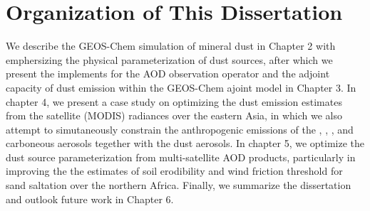 \section{Organization of This Dissertation}

 We describe the GEOS-Chem simulation of mineral dust in Chapter 2 with emphersizing the 
 physical parameterization of dust sources, after which we present the implements for the 
 AOD observation operator and the adjoint capacity of dust emission within the GEOS-Chem
 ajoint model in Chapter 3. In chapter 4, we present a case study on optimizing the dust 
 emission estimates from the satellite (MODIS) radiances over the eastern Asia, 
 in which we also attempt to 
 simutaneously constrain the anthropogenic emissions of the , , , 
 and carboneous aerosols tegether with the dust aerosols. In chapter 5, we optimize the 
 dust source parameterization from multi-satellite AOD products, particularly in improving 
 the the estimates of soil erodibility and wind friction threshold for sand saltation over 
 the northern Africa. Finally, we summarize the dissertation and outlook future work in 
 Chapter 6. 
